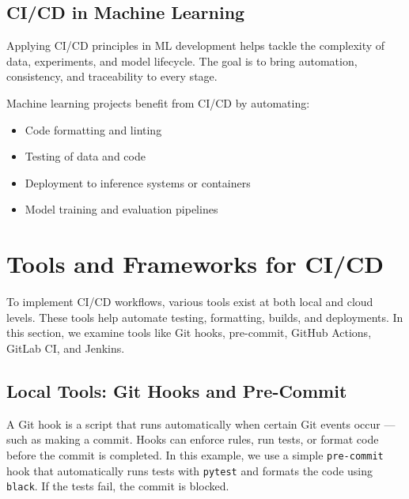 %
\subsection{CI/CD in Machine Learning}
Applying CI/CD principles in ML development helps tackle the complexity of data, experiments, and model lifecycle. The goal is to bring automation, consistency, and traceability to every stage.

Machine learning projects benefit from CI/CD by automating:
\begin{itemize}
\item Code formatting and linting
\item Testing of data and code
\item Deployment to inference systems or containers
\item Model training and evaluation pipelines
\end{itemize}

%
\section{Tools and Frameworks for CI/CD}
To implement CI/CD workflows, various tools exist at both local and cloud levels. These tools help automate testing, formatting, builds, and deployments. In this section, we examine tools like Git hooks, pre-commit, GitHub Actions, GitLab CI, and Jenkins.

%
\subsection{Local Tools: Git Hooks and Pre-Commit}

A Git hook is a script that runs automatically when certain Git events occur — such as making a commit. Hooks can enforce rules, run tests, or format code before the commit is completed. In this example, we use a simple \texttt{pre-commit} hook that automatically runs tests with \texttt{pytest} and formats the code using \texttt{black}. If the tests fail, the commit is blocked.

